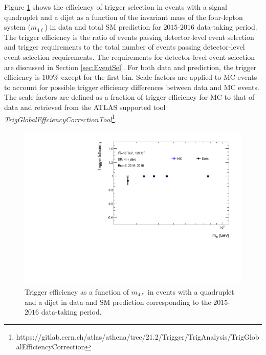 Figure \ref{fig:Trigger} shows the efficiency of trigger selection in events with a signal quadruplet and a dijet as a function of the invariant mass of the four-lepton system ($m_{4\ell}$) in data and total SM prediction for $2015$-$2016$ data-taking period. The trigger efficiency is the ratio of events passing detector-level event selection and trigger requirements to the total number of events passing detector-level event selection requirements. The requirements for detector-level event selection are discussed in Section \ref{sec:EventSel}. For both data and prediction, the trigger efficiency is $100\%$ except for the first bin. Scale factors are applied to MC events to account for possible trigger efficiency differences between data and MC events. The scale factors are defined as a fraction of trigger efficiency for MC to that of data and retrieved from the ATLAS supported tool \textit{TrigGlobalEffciencyCorrectionTool}\footnote{https://gitlab.cern.ch/atlas/athena/tree/21.2/Trigger/TrigAnalysis/TrigGlobalEfficiencyCorrection}.

\begin{figure}[!htbp]
    \centering
    \includegraphics[width=.8\linewidth]{figures/AnalysisOverview/TriggerEfficiency.pdf}
    \caption{ Trigger efficiency as a function of $m_{4\ell}$ in events with a quadruplet and a dijet in data and SM prediction corresponding to the $2015$-$2016$ data-taking period.\label{fig:Trigger}}
\end{figure}